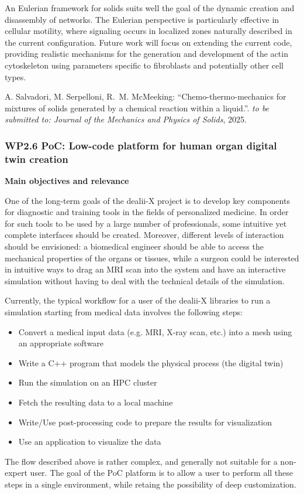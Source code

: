 \documentclass[a4paper,12pt, numbers]{article}
\begin{document}
An Eulerian framework for solids suits well the goal of the dynamic creation and disassembly of networks. The Eulerian perspective is particularly effective in cellular motility, where signaling occurs in localized zones naturally described in the current configuration. Future work will focus on extending the current code, providing realistic mechanisms for the generation and development of the actin cytoskeleton using parameters specific to fibroblasts and potentially other cell types.


\begin{thebibliography}{10}
 A. Salvadori, M. Serpelloni, R.~M. McMeeking: ``Chemo-thermo-mechanics for mixtures of solids generated by a chemical reaction within a liquid.''. \emph{to be submitted to: Journal of the Mechanics and Physics of
Solids}, 2025.
\end{thebibliography}

\subsubsection*{WP2.6 PoC: Low-code platform for human organ digital twin creation}

\noindent\textbf{Main objectives and relevance}

One of the long-term goals of the dealii-X project is to develop key components for diagnostic and training tools in the fields of personalized medicine. In order for such tools to be used by a large number of professionals, some intuitive yet complete interfaces should be created. Moreover, different levels of interaction should be envisioned: a biomedical engineer should be able to access the mechanical properties of the organs or tissues, while a surgeon could be interested in intuitive ways to drag an MRI scan into the system and have an interactive simulation without having to deal with the technical details of the simulation.

Currently, the typical workflow for a user of the dealii-X libraries to run a simulation starting from medical data involves the following steps:
\begin{itemize}
\item Convert a medical input data (e.g. MRI, X-ray scan, etc.) into a mesh using an appropriate software  
\item Write a C++ program that models the physical process (the digital twin)
\item Run the simulation on an HPC cluster
\item Fetch the resulting data to a local machine
\item Write/Use post-processing code to prepare the results for visualization
\item Use an application to visualize the data
\end{itemize} 
The flow described above is rather complex, and generally not suitable for a non-expert user. The goal of the PoC platform is to allow a user to perform all these steps in a single environment, while retaing the possibility of deep customization.
\end{document}
